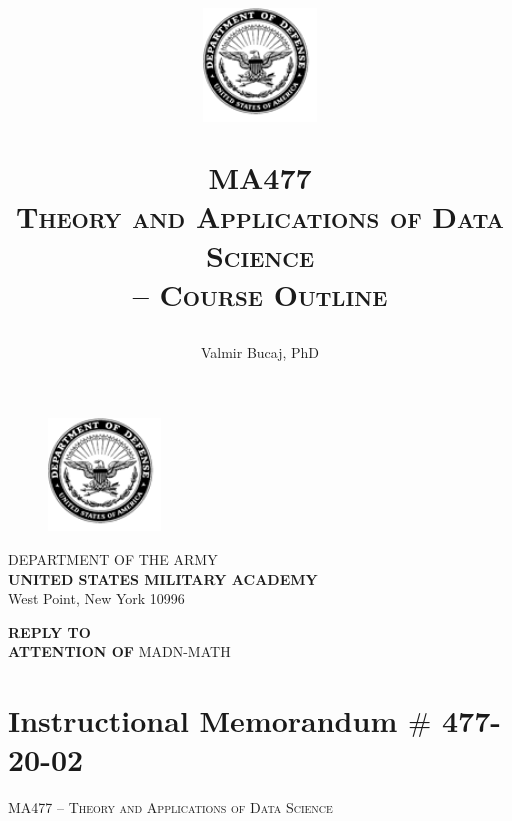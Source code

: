 \documentclass[11pt]{article}
\author{Valmir Bucaj, PhD}
\date{}
\theoremstyle{plain}
\theoremstyle{definition}
\begin{document}
\title{\begin{figure}[h!]
\includegraphics[width=30mm]{logo.png}
\end{figure}\vspace{-1cm}\textsc{MA477\\ Theory and Applications of Data Science \\ -- Course Outline}}

\maketitle

\tableofcontents
\thispagestyle{fancy}

\newpage

\begin{figure}[h!]
\includegraphics[width=30mm]{logo.png}
\end{figure}
\begin{center}
\vspace{-3cm}
DEPARTMENT OF THE ARMY\\
{\bf UNITED STATES MILITARY ACADEMY}\\
West Point, New York 10996
\end{center}
\vspace{.5cm}
{\bf \tiny{REPLY TO \\ ATTENTION OF}}
\vskip 12pt
MADN-MATH	
\vspace{.2cm}


\section{Instructional Memorandum $\#$ 477-20-02}

\begin{center} \textsc{MA477 -- Theory and Applications of Data Science} \end{center}
\end{document}
